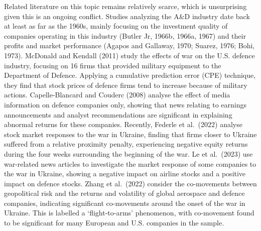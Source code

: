 \documentclass[
  letterpaper,
  DIV=11,
  numbers=noendperiod]{scrartcl}
\begin{document}
Related literature on this topic remains relatively scarce, which is
unsurprising given this is an ongoing conflict. Studies analyzing the
A\&D industry date back at least as far as the 1960s, mainly focusing on
the investment quality of companies operating in this industry (Butler
Jr, 1966b, 1966a, 1967) and their profits and market performance (Agapos
and Gallaway, 1970; Suarez, 1976; Bohi, 1973). McDonald and Kendall
(2011) study the effects of war on the U.S. defence industry, focusing
on 16 firms that provided military equipment to the Department of
Defence. Applying a cumulative prediction error (CPE) technique, they
find that stock prices of defence firms tend to increase because of
military actions. Capelle-Blancard and Couderc (2008) analyse the effect
of media information on defence companies only, showing that news
relating to earnings announcements and analyst recommendations are
significant in explaining abnormal returns for these companies.
Recently, Federle et al.~(2022) analyse stock market responses to the
war in Ukraine, finding that firms closer to Ukraine suffered from a
relative proximity penalty, experiencing negative equity returns during
the four weeks surrounding the beginning of the war. Le et al.~(2023)
use war-related news articles to investigate the market response of some
companies to the war in Ukraine, showing a negative impact on airline
stocks and a positive impact on defence stocks. Zhang et al.~(2022)
consider the co-movements between geopolitical risk and the returns and
volatility of global aerospace and defence companies, indicating
significant co-movements around the onset of the war in Ukraine. This is
labelled a `flight-to-arms' phenomenon, with co-movement found to be
significant for many European and U.S. companies in the sample.
\end{document}
